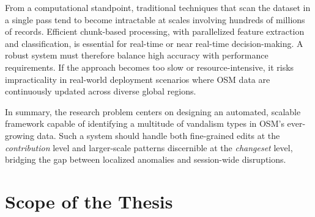\documentclass[
    13pt, %
    a4paper, %
    twoside, 
    DIV14, %
    listof=totoc, %
    bibliography=totoc, %
    index=totoc, %
    headsepline
]{scrreprt}
\begin{document}
From a computational standpoint, traditional techniques that scan the dataset in a single pass tend to become intractable at scales involving hundreds of millions of records. Efficient chunk-based processing, with parallelized feature extraction and classification, is essential for real-time or near real-time decision-making. A robust system must therefore balance high accuracy with performance requirements. If the approach becomes too slow or resource-intensive, it risks impracticality in real-world deployment scenarios where OSM data are continuously updated across diverse global regions.

In summary, the research problem centers on designing an automated, scalable framework capable of identifying a multitude of vandalism types in OSM’s ever-growing data. Such a system should handle both fine-grained edits at the \emph{contribution} level and larger-scale patterns discernible at the \emph{changeset} level, bridging the gap between localized anomalies and session-wide disruptions.

\section{Scope of the Thesis}
\label{sec:thesis_scope}
\end{document}
